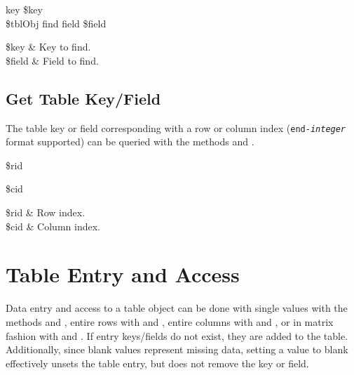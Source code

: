 \begin{syntax}
 key \$key \\
\$tblObj find field \$field
\end{syntax}
\begin{args}
\$key & Key to find. \\
\$field & Field to find.
\end{args}

\subsection{Get Table Key/Field}
The table key or field corresponding with a row or column index (\texttt{end-\textit{integer}} format supported) can be queried with the methods  and . 
\begin{syntax}
 \$rid
\end{syntax}
\begin{syntax}
 \$cid
\end{syntax}
\begin{args}
\$rid & Row index. \\
\$cid & Column index.
\end{args}
\clearpage

\section{Table Entry and Access}
Data entry and access to a table object can be done with single values with the methods  and , entire rows with  and , entire columns with  and , or in matrix fashion with  and  . 
If entry keys/fields do not exist, they are added to the table. 
Additionally, since blank values represent missing data, setting a value to blank effectively unsets the table entry, but does not remove the key or field. 
